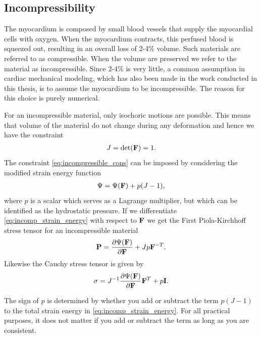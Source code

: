 \subsection{Incompressibility}
\label{sec:incompressibility}

The myocardium is composed by small blood vessels that supply the
myocardial cells with oxygen. When the myocardium contracts, this
perfused blood is squeezed out, resulting in an overall loss of
2-4\% volume\cite{yin1996compressibility}. Such materials are
referred to as compressible. When the 
volume are preserved we refer to the material as incompressible.
Since 2-4\% is very little, a common assumption in cardiac mechanical modeling,
which has also been made in the work conducted in this thesis, is to assume
the myocardium to be incompressible. The reason for this choice is
purely numerical.

For an incompressible material, only isochoric motions are
possible. This means that volume of the material do not change during
any deformation and hence we have the constraint 
\begin{align}
  J = \det(\mathbf{F}) = 1.
  \label{eq:incompressible_cons}
\end{align}
The constraint \eqref{eq:incompressible_cons} can be imposed by
considering the modified strain energy function
\begin{align}
  \Psi = \Psi(\mathbf{F}) + p(J-1),
  \label{eq:incomp_strain_energy}
\end{align}
where $p$ is a scalar which serves as a Lagrange multiplier, but which
can be identified as the hydrostatic pressure. If we differentiate
\eqref{eq:incomp_strain_energy} with respect to $\mathbf{F}$ we get the First
Piola-Kirchhoff stress tensor for an incompressible material
\begin{align}
  \mathbf{P} = \frac{\partial \Psi(\mathbf{F})}{\partial \mathbf{F}} + J p \mathbf{F}^{-T}.
\end{align}
Likewise the Cauchy stress tensor is given by
\begin{align}
  \mathbf{\sigma} = J^{-1} \frac{\partial \Psi(\mathbf{F})}{\partial \mathbf{F}}\mathbf{F}^{T} + p \mathbf{I}.
  \label{eq:cauchy_incomp}
\end{align}


\begin{remark}
  The sign of $p$ is determined by whether you add or subtract the term
  $ p(J-1)$ to the total strain energy in
  \eqref{eq:incomp_strain_energy}. For all practical purposes, it
  does not matter if you add or subtract the term as long as you are
  consistent. 
\end{remark}


